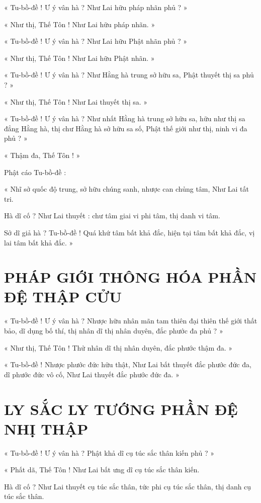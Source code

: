 	« Tu-bồ-đề ! Ư ý vân hà ? Như Lai hữu pháp nhãn phủ ? »
	
	« Như thị, Thế Tôn ! Như Lai hữu pháp nhãn. »
	
	« Tu-bồ-đề ! Ư ý vân hà ? Như Lai hữu Phật nhãn phủ ? »
	
	« Như thị, Thế Tôn ! Như Lai hữu Phật nhãn. »
	
	
	« Tu-bồ-đề ! Ư ý vân hà ? Như Hằng hà trung sở hữu sa, Phật thuyết thị sa phủ ? »
	
	« Như thị, Thế Tôn ! Như Lai thuyết thị sa. »
	
	« Tu-bồ-đề ! Ư ý vân hà ? Như nhất Hằng hà trung sở hữu sa, hữu như thị sa đẳng Hằng hà, thị chư Hằng hà sở hữu sa số, Phật thế giới như thị, ninh vi đa phủ ? »
	
	« Thậm đa, Thế Tôn ! »
	
	Phật cáo Tu-bồ-đề :
	
	« Nhĩ sở quốc độ trung, sở hữu chúng sanh, nhược can chủng tâm, Như Lai tất tri. 
	
	Hà dĩ cố ? Như Lai thuyết : chư tâm giai vi phi tâm, thị danh vi tâm. 
	
	Sở dĩ giả hà ? Tu-bồ-đề ! Quá khứ tâm bất khả đắc, hiện tại tâm bất khả đắc, vị lai tâm bất khả đắc. »
	
	\section*{PHÁP GIỚI THÔNG HÓA PHẦN ĐỆ THẬP CỬU}
	
	« Tu-bồ-đề ! Ư ý vân hà ? Nhược hữu nhân mãn tam thiên đại thiên thế giới thất bảo, dĩ dụng bố thí, thị nhân dĩ thị nhân duyên, đắc phước đa phủ ? »
	
	« Như thị, Thế Tôn ! Thử nhân dĩ thị nhân duyên, đắc phước thậm đa. »
	
	« Tu-bồ-đề ! Nhược phước đức hữu thật, Như Lai bất thuyết đắc phước đức đa, dĩ phước đức vô cố, Như Lai thuyết đắc phước đức đa. »
	
	\section*{LY SẮC LY TƯỚNG PHẦN ĐỆ NHỊ THẬP}
	
	« Tu-bồ-đề ! Ư ý vân hà ? Phật khả dĩ cụ túc sắc thân kiến phủ ? »
	
	« Phất dã, Thế Tôn ! Như Lai bất ưng dĩ cụ túc sắc thân kiến. 
	
	Hà dĩ cố ? Như Lai thuyết cụ túc sắc thân, tức phi cụ túc sắc thân, thị danh cụ túc sắc thân. 
	
